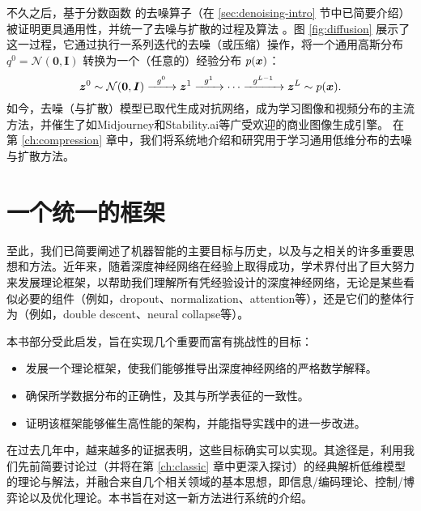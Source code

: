 \documentclass[../../book-main_zh.tex]{subfiles}
\begin{document}
不久之后，基于分数函数 \cite{hyvarinen05a} 的去噪算子（在 \ref{sec:denoising-intro} 节中已简要介绍）被证明更具通用性，并统一了去噪与扩散的过程及算法 \cite{song2019,song2020score,ho2020denoising}。图 \ref{fig:diffusion} 展示了这一过程，它通过执行一系列迭代的去噪（或压缩）操作，将一个通用高斯分布 $q^0 = \mathcal{N}(\boldsymbol{0}, \boldsymbol{I})$ 转换为一个（任意的）经验分布 $p(\bm{x})$：
\begin{equation}
        \bm{z}^0 \sim  \mathcal{N}(\boldsymbol{0}, \boldsymbol{I})\xrightarrow{\hspace{2mm} g^0  \hspace{2mm}} \bm{z}^1 \xrightarrow{\hspace{2mm} g^1 \hspace{2mm}} \cdots \xrightarrow{\hspace{2mm} g^{L-1}  \hspace{2mm}} \bm{z}^L \sim p(\bm{x}).
\end{equation}
如今，去噪（与扩散）模型已取代生成对抗网络，成为学习图像和视频分布的主流方法，并催生了如Midjourney和Stability.ai等广受欢迎的商业图像生成引擎。
在第 \ref{ch:compression} 章中，我们将系统地介绍和研究用于学习通用低维分布的去噪与扩散方法。  



\section{一个统一的框架}\label{sec:unifying-approach}
至此，我们已简要阐述了机器智能的主要目标与历史，以及与之相关的许多重要思想和方法。近年来，随着深度神经网络在经验上取得成功，学术界付出了巨大努力来发展理论框架，以帮助我们理解所有凭经验设计的深度神经网络，无论是某些看似必要的组件（例如，dropout、normalization、attention等），还是它们的整体行为（例如，double descent、neural collapse等）。

本书部分受此启发，旨在实现几个重要而富有挑战性的目标：
\begin{itemize}
    \item 发展一个理论框架，使我们能够推导出深度神经网络的严格数学解释。
    \item 确保所学数据分布的正确性，及其与所学表征的一致性。
    \item 证明该框架能够催生高性能的架构，并能指导实践中的进一步改进。
\end{itemize}
在过去几年中，越来越多的证据表明，这些目标确实可以实现。其途径是，利用我们先前简要讨论过（并将在第 \ref{ch:classic} 章中更深入探讨）的经典解析低维模型的理论与解法，并融合来自几个相关领域的基本思想，即信息/编码理论、控制/博弈论以及优化理论。本书旨在对这一新方法进行系统的介绍。
\end{document}
